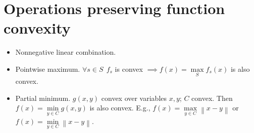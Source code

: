 \documentclass[10pt]{article}
\newcommand{\norm}[1]{\left\lVert #1 \right\rVert}
\begin{document}
\section{Operations preserving function convexity}

\begin{itemize}
  \item Nonnegative linear combination.
  \item Pointwise maximum.
    $\forall s \in S\ \ f_s$ is convex $\implies f(x) = \max\limits_S f_s(x)$ is also convex.
  \item Partial minimum. $g(x,y)$ convex over variables $x, y$; $C$ convex.
    Then $f(x) = \min\limits_{y \in C} g(x,y)$ is also convex.
    E.g., $f(x) = \max\limits_{y \in C} \norm{x-y}$ or $f(x) = \min\limits_{y \in C} \norm{x-y}$.
\end{itemize}



\end{document}
